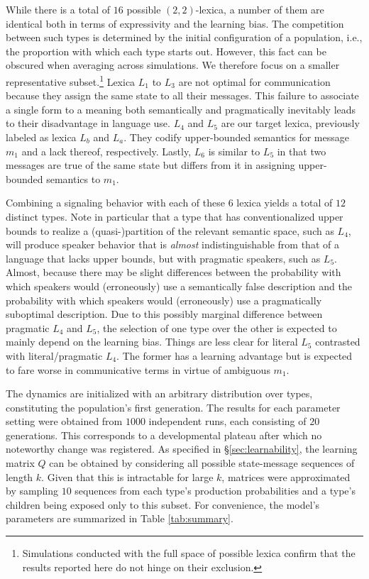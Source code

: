 \documentclass[a4paper]{article}
\begin{document}
While there is a total of $16$ possible $(2,2)$-lexica, a number of them are identical both in terms of expressivity and the learning bias. The competition between such types is determined by the initial configuration of a population, i.e., the proportion with which each type starts out. However, this fact can be obscured when averaging across simulations. We therefore focus on a smaller representative subset.\footnote{Simulations conducted with the full space of possible lexica confirm that the results reported here do not hinge on their exclusion.} Lexica $L_1$ to $L_3$ are not optimal for communication because they assign the same state to all their messages. This failure to associate a single form to a meaning both semantically and pragmatically inevitably leads to their disadvantage in language use. $L_4$ and $L_5$ are our target lexica, previously labeled as lexica $L_b$ and $L_a$. They codify upper-bounded semantics for message $m_1$ and a lack thereof, respectively. Lastly, $L_6$ is similar to $L_5$ in that two messages are true of the same state but differs from it in assigning upper-bounded semantics to $m_1$. 


Combining a signaling behavior with each of these $6$ lexica yields a total of $12$ distinct types. Note in particular  that a type that has conventionalized upper bounds to realize a (quasi-)partition of the relevant semantic space, such as $L_4$, will produce speaker behavior that is {\em almost} indistinguishable from that of a language that lacks upper bounds, but with pragmatic speakers, such as $L_5$. Almost, because there may be slight differences between the probability with which speakers would (erroneously) use a semantically false description and the probability with which speakers would (erroneously) use a pragmatically suboptimal description. Due to this possibly marginal difference between pragmatic $L_4$ and $L_5$, the selection of one type over the other is expected to mainly depend on the learning bias. Things are less clear for literal $L_5$ contrasted with literal/pragmatic $L_4$. The former has a learning advantage but is expected to fare worse in communicative  terms in virtue of ambiguous $m_1$.


The dynamics are initialized with an arbitrary distribution over types, constituting the population's first generation. The results for each parameter setting were obtained from $1000$ independent runs, each consisting of $20$ generations. This corresponds to a developmental plateau after which no noteworthy change was registered. As specified in \S\ref{sec:learnability}, the learning matrix $Q$ can be obtained by considering all possible state-message sequences of length $k$. Given that this is intractable for large $k$, matrices were approximated by sampling $10$ sequences from each type's production probabilities and a type's children being exposed only to this subset. For convenience, the model's parameters are summarized in Table \ref{tab:summary}.
\end{document}
